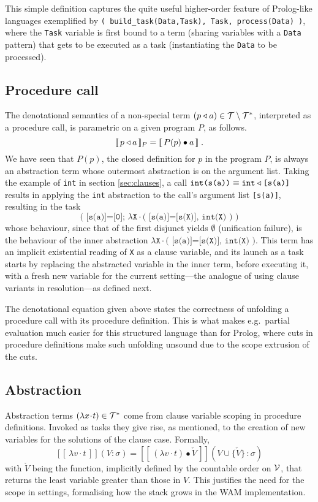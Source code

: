 \documentclass{tlp}
\def\denotstart{[\![\,}
\def\denotend{\,]\!]}
\def\denot#1{\denotstart#1\denotend}
\def\s{\sigma}
\def\appl#1#2{#1\applsym#2}
\def\abstsym{\!\cdot\!}
\def\abst#1#2{\lambda#1\abstsym#2}
\def\abstt#1#2{\lambda\texttt{#1}\abstsym\texttt{#2}}
\def\stng#1#2{#1\!\!:\!#2}
\def\ff{\emptyset}
\newcommand{\apply}[2]{#1\bullet#2}
\newcommand{\next}[1]{\check #1}
\begin{document}
\noindent This simple definition captures the quite useful higher-order
feature of Prolog-like languages exemplified by
\verb=( build_task(Data,Task), Task, process(Data) )=, where the \verb+Task+
variable is first
bound to a term (sharing variables with a \verb+Data+ pattern) that gets to be
executed as a task
(instantiating the \verb+Data+ to be processed).

\subsection{Procedure call}

The denotational semantics of a non-special term $(\appl
pa)\in\T\setminus\T^\ast$, interpreted as a procedure
call, is parametric on a given program $P$, as follows.
$$\denot{\appl pa}_P=\denot{\apply{P(p)}{a}}\;.$$
We have seen that $P(p)$, the closed
definition for $p$ in the program $P$, is
always an abstraction term whose outermost abstraction is on the argument list.
Taking the example of \texttt{int} in section \ref{sec:clauses}, a call
$\texttt{int(s(a))}\equiv\appl{\texttt{int}}{\texttt{[s(a)]}}$ results in
applying the {\tt int}
abstraction to the call's argument list
\texttt{[s(a)]}, resulting in the task\\[-13pt]
\[\texttt{( [s(a)]=[0]; $\abstt{X}{( [s(a)]=[s(X)], int(X) )}$ )}\]
whose behaviour, since that of the first disjunct yields $\ff$ (unification
failure), is the behaviour of the inner abstraction $\abstt{X}{( [s(a)]=[s(X)],
  int(X) )}$.  This term has an implicit existential reading of  \texttt{X} as a clause
variable, and its launch as a task starts by
replacing the abstracted variable in the inner term, before executing it, with a
fresh new variable for the current setting---the analogue of using clause
variants in resolution---as defined next.


The denotational equation given above states the correctness of unfolding a
procedure call with its procedure definition. This is what makes e.g.\ partial
evaluation much easier for this structured language than for Prolog, where cuts
in procedure definitions make such unfolding unsound due to the scope extrusion of
the cuts.


\subsection{Abstraction}

Abstraction terms $(\abst xt)\in\T^\ast$ come from
clause variable scoping in procedure definitions.  Invoked as tasks they give
rise, as mentioned, to
the creation of new variables for the solutions of the clause case. Formally,
$$\denot{\abst vt}(\stng V\s) = \denot{\apply{(\abst vt)}{\next V}}
(\stng{V\cup\{\next V\}\,}\s)$$
with $\next V$ being the function, implicitly defined by the countable order on
${\cal V}$, that returns the least variable greater than those in $V$. This justifies
the need for the scope in settings, formalising how the stack grows in the WAM
implementation.
\end{document}

